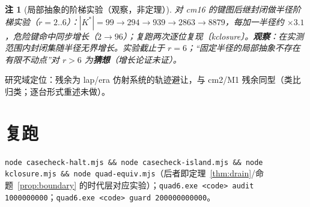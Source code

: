\documentclass[11pt]{ctexart}
\newtheorem{remark}[theorem]{注}
\begin{document}
\begin{remark}[局部抽象的阶梯实验（观察，非定理）]\label{rem:kclosure}
对 cm16 的键图后继封闭做半径阶梯实验（$r=2..6$）：$|K^*|=99\to294\to939\to2863\to8879$，每加一半径约 $\times3.1$，危险键命中同步增长（$2\to96$）；复跑两次逐位复现〔kclosure〕。\textbf{观察}：在实测范围内封闭集随半径无界增长。实验截止于 $r=6$；``固定半径的局部抽象不存在有限不动点''对 $r>6$ 为\textbf{猜想}（增长论证未证）。
\end{remark}

研究域定位：残余为 lap/era 仿射系统的轨迹避让，与 cm2/M1 残余同型（类比归类；逐台形式重述未做）。

\section*{复跑}
\texttt{node casecheck-halt.mjs \&\& node casecheck-island.mjs \&\& node kclosure.mjs \&\& node quad-equiv.mjs}（后者即定理~\ref{thm:drain}/命题~\ref{prop:boundary} 的时代层对应实验）；\texttt{quad6.exe <code> audit 1000000000}；\texttt{quad6.exe <code> guard 200000000000}。
\end{document}
